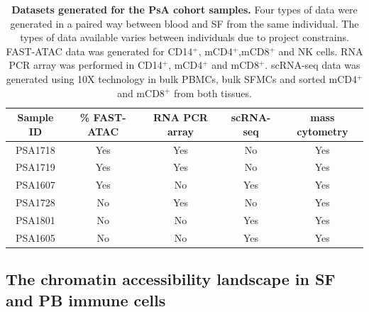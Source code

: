 \begin{table}[htbp]
\centering
\begin{tabular}{@{} c c c c c}
\toprule
\textbf{Sample ID} & \textbf{\% FAST-ATAC} & \textbf{RNA PCR array} & \textbf{scRNA-seq} & \textbf{mass cytometry} \\
\midrule
\midrule
PSA1718 & Yes & Yes & No & Yes\\
PSA1719 & Yes & Yes & No & Yes\\
PSA1607 & Yes & No & Yes & Yes\\
PSA1728 & No & Yes & No & Yes\\
PSA1801 & No & No & Yes & Yes\\
PSA1605 & No & No & Yes & Yes\\
\bottomrule
\end{tabular}
\medskip %
\caption[Datasets generated for the PsA cohort samples]{\textbf{Datasets generated for the PsA cohort samples.} Four types of data were generated in a paired way between blood and SF from the same individual. The types of data available varies between individuals due to project constrains. FAST-ATAC data was generated for CD14$^+$, mCD4$^+$,mCD8$^+$ and NK cells. RNA PCR array was performed in CD14$^+$, mCD4$^+$ and mCD8$^+$. scRNA-seq data was generated using 10X technology in bulk PBMCs, bulk SFMCs and sorted mCD4$^+$ and mCD8$^+$ from both tissues.}
\label{tab:PSA_datasets_per_sample}
\end{table}
\bigskip %


\subsection{The chromatin accessibility landscape in SF and PB immune cells}

